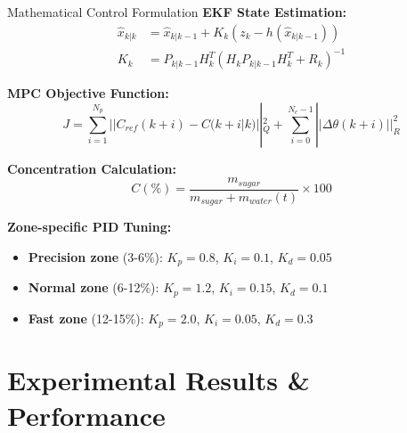 \documentclass[aspectratio=169]{beamer}
\begin{document}
\begin{frame}{Mathematical Control Formulation}
\textbf{EKF State Estimation:}
\begin{align}
\hat{x}_{k|k} &= \hat{x}_{k|k-1} + K_k(z_k - h(\hat{x}_{k|k-1})) \\
K_k &= P_{k|k-1}H_k^T(H_kP_{k|k-1}H_k^T + R_k)^{-1}
\end{align}

\textbf{MPC Objective Function:}
\begin{equation}
J = \sum_{i=1}^{N_p} ||C_{ref}(k+i) - C(k+i|k)||^2_Q + \sum_{i=0}^{N_c-1} ||\Delta\theta(k+i)||^2_R
\end{equation}

\textbf{Concentration Calculation:}
\begin{equation}
C(\%) = \frac{m_{sugar}}{m_{sugar} + m_{water}(t)} \times 100
\end{equation}

\textbf{Zone-specific PID Tuning:}
\begin{itemize}
    \item \textbf{Precision zone} (3-6\%): $K_p=0.8$, $K_i=0.1$, $K_d=0.05$
    \item \textbf{Normal zone} (6-12\%): $K_p=1.2$, $K_i=0.15$, $K_d=0.1$
    \item \textbf{Fast zone} (12-15\%): $K_p=2.0$, $K_i=0.05$, $K_d=0.3$
\end{itemize}
\end{frame}

\section{Experimental Results \& Performance}
\end{document}
